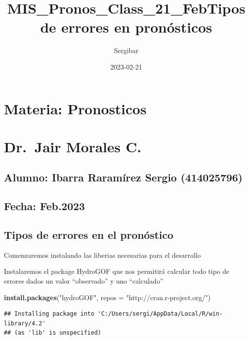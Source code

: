 \documentclass[
]{article}
\title{MIS\_Pronos\_Class\_21\_FebTipos de errores en pronósticos}
\author{Sergibar}
\date{2023-02-21}
\newenvironment{Shaded}{\begin{snugshade}}{\end{snugshade}}
\newcommand{\AttributeTok}[1]{\textcolor[rgb]{0.13,0.29,0.53}{#1}}
\newcommand{\FunctionTok}[1]{\textcolor[rgb]{0.13,0.29,0.53}{\textbf{#1}}}
\newcommand{\NormalTok}[1]{#1}
\newcommand{\StringTok}[1]{\textcolor[rgb]{0.31,0.60,0.02}{#1}}
\begin{document}
\maketitle

\hypertarget{materia-pronosticos}{%
\section{Materia: Pronosticos}\label{materia-pronosticos}}

\hypertarget{dr.-jair-morales-c.}{%
\section{Dr.~Jair Morales C.}\label{dr.-jair-morales-c.}}

\hypertarget{alumno-ibarra-raramuxedrez-sergio-414025796}{%
\subsection{Alumno: Ibarra Raramírez Sergio
(414025796)}\label{alumno-ibarra-raramuxedrez-sergio-414025796}}

\hypertarget{fecha-feb.2023}{%
\subsection{Fecha: Feb.2023}\label{fecha-feb.2023}}

\hypertarget{tipos-de-errores-en-el-pronuxf3stico}{%
\subsection{Tipos de errores en el
pronóstico}\label{tipos-de-errores-en-el-pronuxf3stico}}

Comenzaremos instalando las liberias necesarias para el desarrollo

Instalaremos el package HydroGOF que nos permitirá calcular todo tipo de
errores dados un valor ``observado'' y uno ``calculado''

\begin{Shaded}
\begin{Highlighting}[]
\FunctionTok{install.packages}\NormalTok{(}\StringTok{"hydroGOF"}\NormalTok{, }\AttributeTok{repos =} \StringTok{"http://cran.r{-}project.org/"}\NormalTok{)}
\end{Highlighting}
\end{Shaded}

\begin{verbatim}
## Installing package into 'C:/Users/sergi/AppData/Local/R/win-library/4.2'
## (as 'lib' is unspecified)
\end{verbatim}
\end{document}
